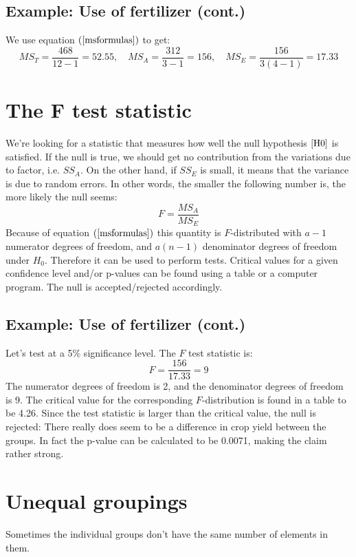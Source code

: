 \documentclass[12pt, a4paper]{article}
\begin{document}
\subsection{Example: Use of fertilizer (cont.)}
We use equation $(\ref{msformulas})$ to get:
\begin{equation}
MS_T=\frac{468}{12-1}=52.55,\quad MS_A=\frac{312}{3-1}=156,\quad MS_E=\frac{156}{3(4-1)}=17.33
\end{equation}

\section{The F test statistic}
We're looking for a statistic that measures how well the null hypothesis $\ref{H0}$ is satisfied. If the null is true, we should get no contribution from the variations due to factor, i.e. $SS_A$. On the other hand, if $SS_E$ is small, it means that the variance is due to random errors. In other words, the smaller the following number is, the more likely the null seems:
\begin{equation}
\label{Fscore}
F=\frac{MS_A}{MS_E}
\end{equation}
Because of equation $(\ref{msformulas})$ this quantity is $F$-distributed with $a-1$ numerator degrees of freedom, and $a(n-1)$ denominator degrees of freedom under $H_0$. Therefore it can be used to perform tests. Critical values for a given confidence level and/or p-values can be found using a table or a computer program. The null is accepted/rejected accordingly.

\subsection{Example: Use of fertilizer (cont.)}
Let's test at a 5\% significance level. The $F$ test statistic is:
\begin{equation}
F=\frac{156}{17.33}=9
\end{equation}
The numerator degrees of freedom is 2, and the denominator degrees of freedom is 9. The critical value for the corresponding $F$-distribution is found in a table to be 4.26. Since the test statistic is larger than the critical value, the null is rejected: There really does seem to be a difference in crop yield between the groups. In fact the p-value can be calculated to be 0.0071, making the claim rather strong.

\section{Unequal groupings}
Sometimes the individual groups don't have the same number of elements in them.
\end{document}
